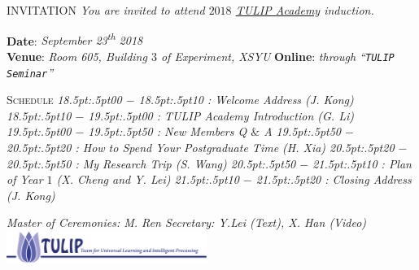 \documentclass{article}
\begin{document}
%

\obeylines%

{ INVITATION}
\bigbreak
\textit{%
  You are invited to attend $2018$ \href{http://www.tulip.org.au}{TULIP Academy} induction.
}

\vspace{4pt}

{\scshape }

\textbf{Date}:  \textit{September 23\/\rlap{,}\textsuperscript{th} 2018} \\ %
\textbf{Venue}: \textit{Room 605, Building $3$ of Experiment, XSYU}
\textbf{Online}: \textit{through ``\texttt{TULIP Seminar}''}


\medbreak
{\scshape  Schedule}
\textit{%
\footnotesize{
  18\kern.5pt:\kern.5pt00 $-$ 18\kern.5pt:\kern.5pt10 : Welcome Address (J. Kong)
  18\kern.5pt:\kern.5pt10 $-$ 19\kern.5pt:\kern.5pt00 : TULIP Academy Introduction (G. Li)
  19\kern.5pt:\kern.5pt00 $-$ 19\kern.5pt:\kern.5pt50 : New Members Q $\&$ A
  19\kern.5pt:\kern.5pt50 $-$ 20\kern.5pt:\kern.5pt20 : How to Spend Your Postgraduate Time (H. Xia)
  20\kern.5pt:\kern.5pt20 $-$ 20\kern.5pt:\kern.5pt50 : My Research Trip (S. Wang)
  20\kern.5pt:\kern.5pt50 $-$ 21\kern.5pt:\kern.5pt10 : Plan of Year $1$ (X. Cheng and Y. Lei)
  21\kern.5pt:\kern.5pt10 $-$ 21\kern.5pt:\kern.5pt20 : Closing Address (J. Kong)}
}

\medbreak
{\scshape }
\textit{%
\tiny{
  Master of Ceremonies: M. Ren
  Secretary: Y.Lei (Text), X. Han (Video)
  }
\vspace{1.2pt}
\includegraphics[width=6.5cm]{logos/tulip-wordmark.eps}
}
\end{document}
